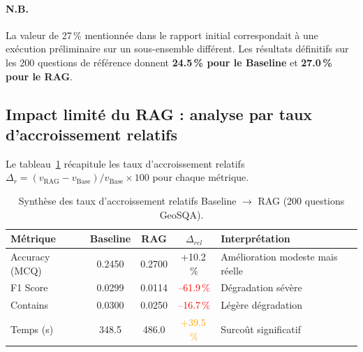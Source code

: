 \documentclass[12pt,a4paper]{article}
\begin{document}
\paragraph{N.B.}
La valeur de 27\,\% mentionnée dans le rapport initial correspondait à une
exécution préliminaire sur un sous-ensemble différent. Les résultats définitifs
sur les 200 questions de référence donnent \textbf{24.5\,\% pour le Baseline}
et \textbf{27.0\,\% pour le RAG}.


\subsection{Impact limité du RAG : analyse par taux d'accroissement relatifs}
\label{sec:rag_impact}

Le tableau~\ref{tab:delta_relatifs} récapitule les taux d'accroissement relatifs
$\Delta_r = (v_{\text{RAG}} - v_{\text{Base}}) / v_{\text{Base}} \times 100$
pour chaque métrique.

\begin{table}[H]
\centering
\caption{Synthèse des taux d'accroissement relatifs Baseline $\rightarrow$ RAG
  (200 questions GeoSQA).}
\label{tab:delta_relatifs}
\begin{tabular}{@{} l c c c p{5cm} @{}}
\toprule
\textbf{Métrique} & \textbf{Baseline} & \textbf{RAG}
  & \textbf{$\Delta_{rel}$} & \textbf{Interprétation} \\
\midrule
Accuracy (MCQ) & 0.2450 & 0.2700
  & \textcolor{green!60!black}{+10.2\,\%}
  & Amélioration modeste mais réelle \\
F1 Score  & 0.0299 & 0.0114
  & \textcolor{red}{--61.9\,\%}
  & Dégradation sévère \\
Contains  & 0.0300 & 0.0250
  & \textcolor{red}{--16.7\,\%}
  & Légère dégradation \\
Temps (s) & 348.5  & 486.0
  & \textcolor{orange}{+39.5\,\%}
  & Surcoût significatif \\
\bottomrule
\end{tabular}
\end{table}
\end{document}
